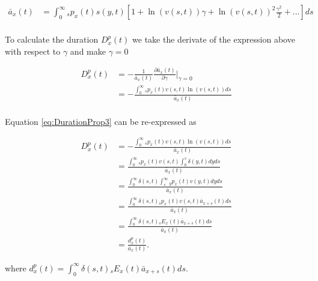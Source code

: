 \documentclass[12pt]{article}
\begin{document}
\begin{equation}\label{eq:DurationProp2}
\begin{split}
\bar{a}_x(t) &= \int_0^\infty {}_sp_x(t) s(y,t)[1+\ln(v(s,t)) \gamma+{\ln(v(s,t))}^2 \frac{\gamma^2}{2}+...]ds\\
\end{split}
\end{equation}


To calculate the duration ${D}^{p}_{x}(t)$ we take the derivate of the expression above with respect to $\gamma$ and make $\gamma=0$

\begin{equation}\label{eq:DurationProp3}
\begin{split}
{D}^{p}_{x}(t)&=-\frac{1}{\bar{a}_x(t)}\frac{\partial \bar{a}_x(t)}{\partial \gamma} \bigg\rvert_{\gamma=0} \\
&= -\frac{\int_0^\infty {}_sp_x(t) v(s,t) \ln(v(s,t))ds}{\bar{a}_x(t)} \\
\end{split}
\end{equation}


Equation \ref{eq:DurationProp3} can be re-expressed as 


\begin{equation}\label{eq:DurationProp4}
\begin{split}
{D}^{p}_{x}(t) &= -\frac{\int_0^\infty {}_sp_x(t) v(s,t) \ln(v(s,t))ds}{\bar{a}_x(t)}\\
&= \frac{\int_0^\infty {}_sp_x(t) v(s,t) \int_0^{s} \delta(y,t)dy ds }{\bar{a}_x(t)}\\
&= \frac{\int_0^\infty \delta(s,t)  \int_{s}^{\infty} {}_{y}p_x(t) v(y,t)dy ds }{\bar{a}_x(t)}\\
&= \frac{\int_0^\infty \delta(s,t) {}_sp_x(t) v(s,t) \bar{a}_{x+s}(t)  ds }{\bar{a}_x(t)}\\
&= \frac{\int_0^\infty \delta(s,t) {}_sE_x(t) \bar{a}_{x+s}(t) ds}{\bar{a}_x(t)} \\
&= \frac{{d}^{p}_{x}(t)}{\bar{a}_x(t)}.
\end{split}
\end{equation}



where ${d}^{p}_{x}(t)=\int_0^\infty \delta(s,t) {}_sE_x(t) \bar{a}_{x+s}(t) ds$.
\end{document}
